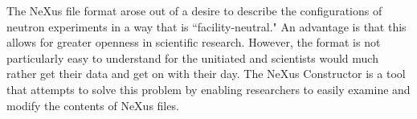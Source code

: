 The NeXus file format arose out of a desire to describe the configurations of neutron experiments in a way that is ``facility-neutral." An advantage is that this allows for greater openness in scientific research. However, the format is not particularly easy to understand for the unitiated and scientists would much rather get their data and get on with their day. The NeXus Constructor is a tool that attempts to solve this problem by enabling researchers to easily examine and modify the contents of NeXus files.
